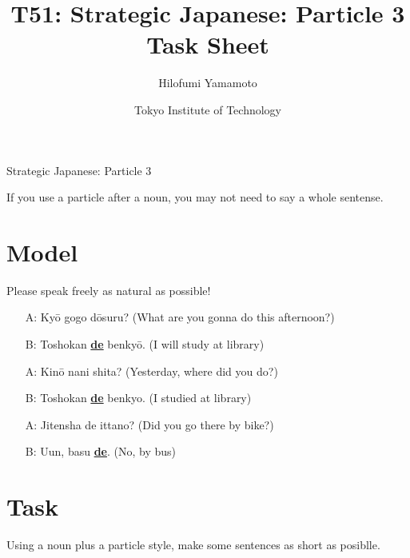 \documentclass[uplatex,a4paper]{jsarticle}
\title{T51: Strategic Japanese: Particle 3 Task Sheet}
\author{Hilofumi Yamamoto}
\date{Tokyo Institute of Technology}
\begin{document}
\thispagestyle{fancy}

{\noindent\LARGE Strategic Japanese: Particle 3}

\vspace*{.5\baselineskip}


If you use a particle after a noun, you may not need to say a whole sentense.

\section{Model}

Please speak freely as natural as possible! 


\begin{itemize}
 \item[A:] Ky\=o gogo d\=osuru? (What are you gonna do this afternoon?) 
 \item[B:] Toshokan \underline{{\bfseries de}} benky\=o. (I will study at library)
 \item[A:] Kin\=o nani shita? (Yesterday, where did you do?) 
 \item[B:] Toshokan \underline{{\bfseries de}} benkyo. (I studied at library)
 \item[A:] Jitensha de ittano? (Did you go there by bike?) 
 \item[B:] Uun, basu \underline{{\bfseries de}}. (No, by bus)
\end{itemize}

\vspace*{-1\baselineskip}

\section{Task}
 
Using a noun plus a particle style, make some sentences as short as posiblle.
\end{document}
